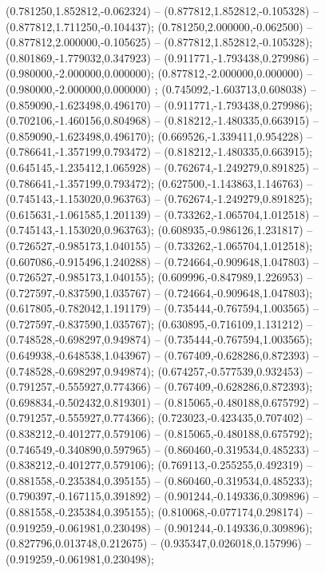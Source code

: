 (0.781250,1.852812,-0.062324) -- (0.877812,1.852812,-0.105328) -- (0.877812,1.711250,-0.104437);
 (0.781250,2.000000,-0.062500) -- (0.877812,2.000000,-0.105625) -- (0.877812,1.852812,-0.105328);
 (0.801869,-1.779032,0.347923) -- (0.911771,-1.793438,0.279986) -- (0.980000,-2.000000,0.000000);
 (0.877812,-2.000000,0.000000) -- (0.980000,-2.000000,0.000000) ;
 (0.745092,-1.603713,0.608038) -- (0.859090,-1.623498,0.496170) -- (0.911771,-1.793438,0.279986);
 (0.702106,-1.460156,0.804968) -- (0.818212,-1.480335,0.663915) -- (0.859090,-1.623498,0.496170);
 (0.669526,-1.339411,0.954228) -- (0.786641,-1.357199,0.793472) -- (0.818212,-1.480335,0.663915);
 (0.645145,-1.235412,1.065928) -- (0.762674,-1.249279,0.891825) -- (0.786641,-1.357199,0.793472);
 (0.627500,-1.143863,1.146763) -- (0.745143,-1.153020,0.963763) -- (0.762674,-1.249279,0.891825);
 (0.615631,-1.061585,1.201139) -- (0.733262,-1.065704,1.012518) -- (0.745143,-1.153020,0.963763);
 (0.608935,-0.986126,1.231817) -- (0.726527,-0.985173,1.040155) -- (0.733262,-1.065704,1.012518);
 (0.607086,-0.915496,1.240288) -- (0.724664,-0.909648,1.047803) -- (0.726527,-0.985173,1.040155);
 (0.609996,-0.847989,1.226953) -- (0.727597,-0.837590,1.035767) -- (0.724664,-0.909648,1.047803);
 (0.617805,-0.782042,1.191179) -- (0.735444,-0.767594,1.003565) -- (0.727597,-0.837590,1.035767);
 (0.630895,-0.716109,1.131212) -- (0.748528,-0.698297,0.949874) -- (0.735444,-0.767594,1.003565);
 (0.649938,-0.648538,1.043967) -- (0.767409,-0.628286,0.872393) -- (0.748528,-0.698297,0.949874);
 (0.674257,-0.577539,0.932453) -- (0.791257,-0.555927,0.774366) -- (0.767409,-0.628286,0.872393);
 (0.698834,-0.502432,0.819301) -- (0.815065,-0.480188,0.675792) -- (0.791257,-0.555927,0.774366);
 (0.723023,-0.423435,0.707402) -- (0.838212,-0.401277,0.579106) -- (0.815065,-0.480188,0.675792);
 (0.746549,-0.340890,0.597965) -- (0.860460,-0.319534,0.485233) -- (0.838212,-0.401277,0.579106);
 (0.769113,-0.255255,0.492319) -- (0.881558,-0.235384,0.395155) -- (0.860460,-0.319534,0.485233);
 (0.790397,-0.167115,0.391892) -- (0.901244,-0.149336,0.309896) -- (0.881558,-0.235384,0.395155);
 (0.810068,-0.077174,0.298174) -- (0.919259,-0.061981,0.230498) -- (0.901244,-0.149336,0.309896);
 (0.827796,0.013748,0.212675) -- (0.935347,0.026018,0.157996) -- (0.919259,-0.061981,0.230498);
